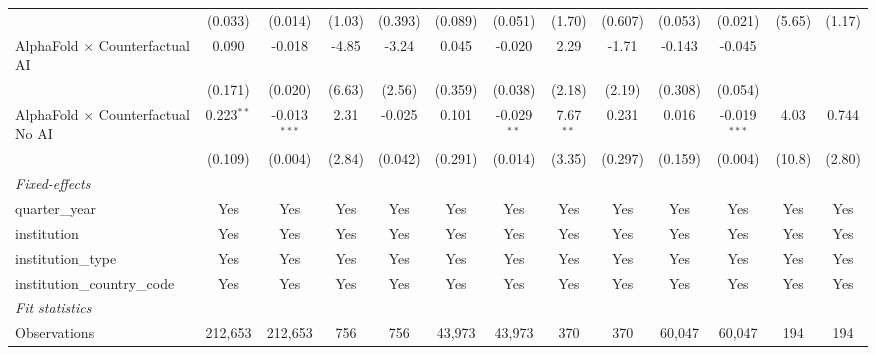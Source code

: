 \begin{tabular}{lcccccccccccc}
                                            & (0.033)      & (0.014)        & (1.03)      & (0.393)     & (0.089)       & (0.051)       & (1.70)      & (0.607) & (0.053)       & (0.021)        & (5.65) & (1.17)\\   
   AlphaFold $\times$ Counterfactual AI     & 0.090        & -0.018         & -4.85       & -3.24       & 0.045         & -0.020        & 2.29        & -1.71   & -0.143        & -0.045         &        &   \\   
                                            & (0.171)      & (0.020)        & (6.63)      & (2.56)      & (0.359)       & (0.038)       & (2.18)      & (2.19)  & (0.308)       & (0.054)        &        &   \\   
   AlphaFold $\times$ Counterfactual No AI  & 0.223$^{**}$ & -0.013$^{***}$ & 2.31        & -0.025      & 0.101         & -0.029$^{**}$ & 7.67$^{**}$ & 0.231   & 0.016         & -0.019$^{***}$ & 4.03   & 0.744\\   
                                            & (0.109)      & (0.004)        & (2.84)      & (0.042)     & (0.291)       & (0.014)       & (3.35)      & (0.297) & (0.159)       & (0.004)        & (10.8) & (2.80)\\   
   \midrule
   \emph{Fixed-effects}\\
   quarter\_year                            & Yes          & Yes            & Yes         & Yes         & Yes           & Yes           & Yes         & Yes     & Yes           & Yes            & Yes    & Yes\\  
   institution                              & Yes          & Yes            & Yes         & Yes         & Yes           & Yes           & Yes         & Yes     & Yes           & Yes            & Yes    & Yes\\  
   institution\_type                        & Yes          & Yes            & Yes         & Yes         & Yes           & Yes           & Yes         & Yes     & Yes           & Yes            & Yes    & Yes\\  
   institution\_country\_code               & Yes          & Yes            & Yes         & Yes         & Yes           & Yes           & Yes         & Yes     & Yes           & Yes            & Yes    & Yes\\  
   \midrule
   \emph{Fit statistics}\\
   Observations                             & 212,653      & 212,653        & 756         & 756         & 43,973        & 43,973        & 370         & 370     & 60,047        & 60,047         & 194    & 194\\  

\end{tabular}
